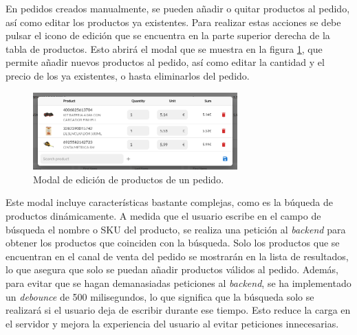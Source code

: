 En pedidos creados manualmente, se pueden añadir o quitar productos al pedido, así como editar los productos ya existentes. Para realizar estas acciones se debe pulsar el icono de edición que se encuentra en la parte superior derecha de la tabla de productos. Esto abrirá el modal que se muestra en la figura \ref{fig:dev:ss:modal_edicion_productos_pedido}, que permite añadir nuevos productos al pedido, así como editar la cantidad y el precio de los ya existentes, o hasta eliminarlos del pedido.

\begin{figure}
    \centering
    \includegraphics[width=0.7\textwidth]{figures/design_develop/screenshots/modal_edicion_productos_pedido.png}
    \caption{Modal de edición de productos de un pedido.}
    \label{fig:dev:ss:modal_edicion_productos_pedido}
\end{figure}

Este modal incluye características bastante complejas, como es la búqueda de productos dinámicamente. A medida que el usuario escribe en el campo de búsqueda el nombre o SKU del producto, se realiza una petición al \textit{backend} para obtener los productos que coinciden con la búsqueda. Solo los productos que se encuentran en el canal de venta del pedido se mostrarán en la lista de resultados, lo que asegura que solo se puedan añadir productos válidos al pedido. Además, para evitar que se hagan demanasiadas peticiones al \textit{backend}, se ha implementado un \textit{debounce} de 500 milisegundos, lo que significa que la búsqueda solo se realizará si el usuario deja de escribir durante ese tiempo. Esto reduce la carga en el servidor y mejora la experiencia del usuario al evitar peticiones innecesarias.

